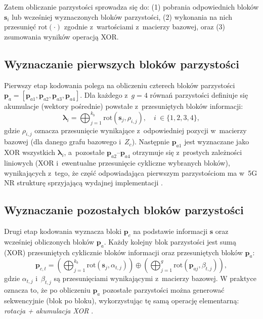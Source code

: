 Zatem obliczanie parzystości sprowadza się do: (1) pobrania odpowiednich bloków $\mathbf{s}_i$ lub wcześniej wyznaczonych
bloków parzystości, (2) wykonania na nich przesunięć $\mathrm{rot}(\cdot)$ zgodnie z~wartościami z~macierzy bazowej,
oraz (3) zsumowania wyników operacją XOR.

\subsection{Wyznaczanie pierwszych bloków parzystości}
Pierwszy etap kodowania polega na obliczeniu czterech bloków parzystości $\mathbf{p}_a = [\mathbf{p}_{a1},\mathbf{p}_{a2},\mathbf{p}_{a3},\mathbf{p}_{a4}]$.
Dla każdego z~$g=4$ równań parzystości definiuje się akumulacje (wektory pośrednie) powstałe z~przesuniętych bloków informacji:
\begin{equation}
\boldsymbol{\lambda}_i = \bigoplus_{j=1}^{k_b} \mathrm{rot}\!\left(\mathbf{s}_j, \rho_{i,j}\right), \quad i~\in \{1,2,3,4\},
\label{eq:lambda_def}
\end{equation}
gdzie $\rho_{i,j}$ oznacza przesunięcie wynikające z~odpowiedniej pozycji w~macierzy bazowej (dla danego grafu bazowego i~$Z_c$).
Następnie $\mathbf{p}_{a1}$ jest wyznaczane jako XOR wszystkich $\boldsymbol{\lambda}_i$, a~pozostałe $\mathbf{p}_{a2}$--$\mathbf{p}_{a4}$
otrzymuje się z~prostych zależności liniowych (XOR i~ewentualne przesunięcie cykliczne wybranych bloków), wynikających z~tego,
że część odpowiadająca pierwszym parzystościom ma w~5G NR strukturę sprzyjającą wydajnej implementacji \cite{bib:nguyen2019_qcldpc}.

\subsection{Wyznaczanie pozostałych bloków parzystości}
Drugi etap kodowania wyznacza bloki $\mathbf{p}_c$ na podstawie informacji $\mathbf{s}$ oraz wcześniej obliczonych bloków $\mathbf{p}_a$.
Każdy kolejny blok parzystości jest sumą (XOR) przesuniętych cyklicznie bloków informacji oraz przesuniętych bloków $\mathbf{p}_a$:
\begin{equation}
\mathbf{p}_{c,t} =
\left(\bigoplus_{j=1}^{k_b} \mathrm{rot}\!\left(\mathbf{s}_j, \alpha_{t,j}\right)\right)
\oplus
\left(\bigoplus_{j=1}^{g} \mathrm{rot}\!\left(\mathbf{p}_{a j}, \beta_{t,j}\right)\right),
\label{eq:pc_def}
\end{equation}
gdzie $\alpha_{t,j}$ i~$\beta_{t,j}$ są przesunięciami wynikającymi z~macierzy bazowej. W praktyce oznacza to, że po obliczeniu $\mathbf{p}_a$
pozostałe parzystości można generować sekwencyjnie (blok po bloku), wykorzystując tę samą operację elementarną:
\emph{rotacja + akumulacja XOR} \cite{bib:nguyen2019_qcldpc}.




